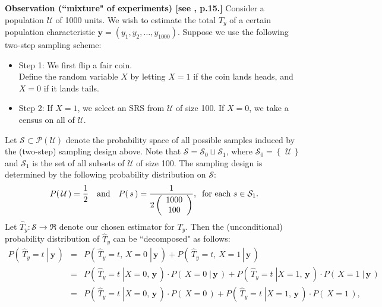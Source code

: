 \documentclass{article}
\begin{document}
\vskip 0.5cm
\noindent
\textbf{Observation (``mixture" of experiments) [see \cite{Valliant2000}, p.15.]}\vskip 0.1cm
\noindent
Consider a population $\mathcal{U}$ of 1000 units.
We wish to estimate the total $T_{y}$ of a certain population characteristic $\mathbf{y} = (y_{1},y_{2},\ldots,y_{1000})$.
Suppose we use the following two-step sampling scheme:
\begin{itemize}
\item	Step 1: We first flip a fair coin.\\
		Define the random variable $X$ by letting $X = 1$ if the coin lands heads, and $X = 0$ if it lands tails.
\item	Step 2: If $X = 1$, we select an SRS from $\mathcal{U}$ of size 100. If $X = 0$, we take a census on all of $\mathcal{U}$.
\end{itemize}
Let $\mathcal{S} \subset \mathcal{P}(\mathcal{U})$ denote the probability space of all
possible samples induced by the (two-step) sampling design above.
Note that $\mathcal{S} = \mathcal{S}_{0} \sqcup \mathcal{S}_{1}$,
where $\mathcal{S}_{0} = \left\{\,\,\mathcal{U}\,\right\}$ and
$\mathcal{S}_{1}$ is the set of all subsets of $\mathcal{U}$ of size 100.
The sampling design is determined by the following probability distribution on $\mathcal{S}$:
\begin{equation*}
P\!\left(\,\mathcal{U}\,\right) = \dfrac{1}{2}
\quad\textnormal{and}\quad
P\!\left(\,s\,\right) = \frac{1}{2\left(\begin{array}{c}1000\\100\end{array}\right)},
\;\;\textnormal{for each $s \in \mathcal{S}_{1}$}.
\end{equation*}
Let $\widehat{T}_{y}:\mathcal{S} \longrightarrow \Re$ denote our chosen estimator for $T_{y}$.
Then the (unconditional) probability distribution of $\widehat{T}_{y}$ can be ``decomposed" as follows:
\begin{eqnarray*}
P\left(\,\left.\widehat{T}_{y} = t\;\right\vert\,\mathbf{y}\,\right)
&=& P\left(\,\left.\widehat{T}_{y} = t,\,X = 0\;\right\vert\,\mathbf{y}\,\right) + P\left(\,\left.\widehat{T}_{y} = t,\,X = 1\,\right\vert\,\mathbf{y}\,\right) \\
&=& P\left(\,\left.\widehat{T}_{y} = t\;\right\vert X = 0,\,\mathbf{y}\,\right)\cdot P\left(\,\left.X = 0\;\right\vert\,\mathbf{y}\,\right)
	+ P\left(\,\left.\widehat{T}_{y} = t\;\right\vert X = 1,\,\mathbf{y}\,\right)\cdot P\left(\,\left.X = 1\;\right\vert\,\mathbf{y}\,\right) \\
&=& P\left(\,\left.\widehat{T}_{y} = t\;\right\vert X = 0,\,\mathbf{y}\,\right)\cdot P\left(\,X = 0\,\right)
	+ P\left(\,\left.\widehat{T}_{y} = t\;\right\vert X = 1,\,\mathbf{y}\,\right)\cdot P\left(\,X = 1\,\right),
\end{eqnarray*}
\end{document}
